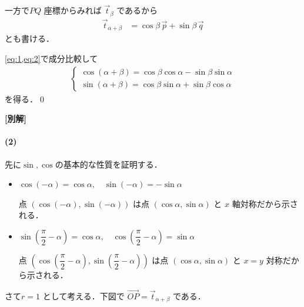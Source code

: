 \documentclass[../../main.tex]{subfiles}
\begin{document}
一方で$PQ$ 座標からみれば $\vec{t}_\beta$ であるから
\begin{align}
  \vec{t}_{\alpha+\beta} &= \cos\beta \, \vec{p} + \sin\beta \, \vec{q} \label{eq:2}
\end{align}
とも書ける．

\cref{eq:1,eq:2}で成分比較して
\begin{align}
  \begin{cases}
    \cos(\alpha+\beta) = \cos\beta \cos\alpha - \sin\beta \sin\alpha \\
    \sin(\alpha+\beta) = \cos\beta \sin\alpha + \sin\beta \cos\alpha
  \end{cases}
\end{align}
を得る．\qed

{\bf [別解]}

\paragraph{(2)}

先に$\sin, \cos$の基本的な性質を証明する．
\begin{itemize}
  \item[(I)] $\cos(-\alpha) = \cos\alpha, \quad \sin(-\alpha) = -\sin\alpha$

    点 $(\cos(-\alpha), \sin(-\alpha))$ は点 $(\cos\alpha, \sin\alpha)$ と $x$ 軸対称だから示される．
  \item[(II)] $\sin\left(\dfrac{\pi}{2} - \alpha\right) = \cos\alpha, \quad \cos\left(\dfrac{\pi}{2} - \alpha\right) = \sin\alpha$

    点 $\left(\cos\left(\dfrac{\pi}{2}-\alpha\right), \sin\left(\dfrac{\pi}{2}-\alpha\right)\right)$ は点 $(\cos\alpha, \sin\alpha)$ と $x=y$ 対称だから示される．
\end{itemize}

さて$r=1$ として考える．下図で $\overrightarrow{OP} = \vec{t}_{\alpha+\beta}$ である．
\end{document}
